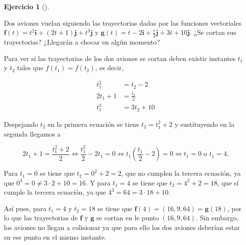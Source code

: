 \documentclass[
  a4paper,
]{scrreport}
\theoremstyle{definition}
\newtheorem{exercise}{Ejercicio}[chapter]
\theoremstyle{remark}
\begin{document}
\begin{exercise}[]\protect\hypertarget{exr-intersección-trayectorias}{}\label{exr-intersección-trayectorias}

Dos aviones vuelan siguiendo las trayectorias dadas por las funciones
vectoriales
\(\mathbf{f}(t)=t^2\mathbf{i}+(2t+1)\mathbf{j}+t^3\mathbf{j}\) y
\(\mathbf{g}(t)=t-2\mathbf{i}+\frac{t}{2}\mathbf{j}+3t+10\mathbf{j}\).
¿Se cortan sus trayectorias? ¿Llegarán a chocar en algún momento?

\end{exercise}

\begin{tcolorbox}[enhanced jigsaw, toprule=.15mm, coltitle=black, colframe=quarto-callout-tip-color-frame, leftrule=.75mm, breakable, left=2mm, opacitybacktitle=0.6, colbacktitle=quarto-callout-tip-color!10!white, bottomrule=.15mm, opacityback=0, title=\textcolor{quarto-callout-tip-color}{\faLightbulb}\hspace{0.5em}{Solución}, bottomtitle=1mm, toptitle=1mm, titlerule=0mm, colback=white, arc=.35mm, rightrule=.15mm]

Para ver si las trayectorias de los dos aviones se cortan deben existir
instantes \(t_1\) y \(t_2\) tales que \(f(t_1)=f(t_2)\), es decir,

\begin{align*}
t_1^2 &= t_2-2\\
2t_1+1 &= \frac{t_2}{2}\\
t_1^3 &= 3t_2+10
\end{align*}

Despejando \(t_2\) en la primera ecuación se tiene \(t_2 = t_1^2+2\) y
sustituyendo en la segunda llegamos a

\[
2t_1 + 1 = \frac{t_1^2+2}{2} \Leftrightarrow \frac{t_1^2}{2}-2t_1 = 0 \Leftrightarrow t_1\left(\frac{t_1}{2}-2\right)=0 \Leftrightarrow t_1 = 0 \mbox{ o } t_1 = 4.
\]

Para \(t_1=0\) se tiene que \(t_2 = 0^2+2 = 2\), que no cumplen la
tercera ecuación, ya que \(0^3=0\neq 3\cdot 2 +10 =16\). Y para
\(t_1=4\) se tiene que \(t_2=4^2+2=18\), que sí cumple la tercera
ecuación, ya que \(4^3 = 64 = 3\cdot 18 + 10\).

Así pues, para \(t_1=4\) y \(t_2=18\) se tiene que
\(\mathbf{f}(4) = (16, 9, 64) = \mathbf{g}(18)\), por lo que las
trayectorias de \(\mathbf{f}\) y \(\mathbf{g}\) se cortan en le punto
\((16, 9, 64)\). Sin embargo, los aviones no llegan a colisionar ya que
para ello los dos aviones deberían estar en ese punto en el mismo
instante.

\end{tcolorbox}
\end{document}
